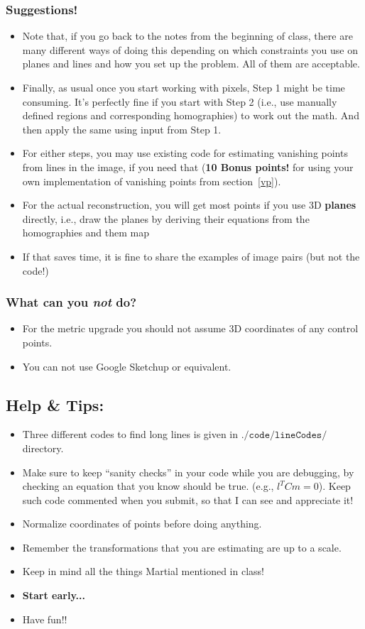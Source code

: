 \documentclass[11pt]{article}
\begin{document}
\subsubsection{Suggestions!}
\begin{itemize}
\item Note that, if you go back to the notes from the beginning of class, there are
many different ways of doing this depending on which constraints you use
on planes and lines and how you set up the problem. All of them are
acceptable.
\item Finally, as usual once you start working with pixels, Step 1 might be time
consuming. It's perfectly fine if you start with Step 2 (i.e., use manually
defined regions and corresponding homographies) to work out the math. And then apply the same using input from Step 1.
\item For either steps, you may use existing code for estimating vanishing points
from lines in the image, if you need that ({\bf 10 Bonus points!} for using your own implementation of vanishing points from section~\ref{vp}).
\item For the actual reconstruction, you will get most points if you use 3D {\bf planes} directly, i.e., draw the planes by deriving their equations from the homographies and them map 

\item If that saves time, it is fine to share the examples of image pairs (but not the code!)
\end{itemize}

\subsubsection{What can you {\it not} do?}
\begin{itemize}
\item For the metric upgrade you should not assume 3D coordinates of any control points.
\item You can not use Google Sketchup or equivalent.
\end{itemize}

\subsection{Help \& Tips:}
\label{sec:helpercode}
\begin{itemize}
\item Three different codes to find long lines is given in $\texttt{./code/lineCodes/}$ directory.
\item Make sure to keep ``sanity checks'' in your code while you are debugging, by checking an equation that you know should be true. (e.g., $l^TCm=0$). Keep such code commented when you submit, so that I can see and appreciate it!
\item Normalize coordinates of points before doing anything.
\item Remember the transformations that you are estimating are up to a scale.
\item Keep in mind all the things Martial mentioned in class!
\item \textbf{Start early...}
\item Have fun!!
\end{itemize}
\end{document}
